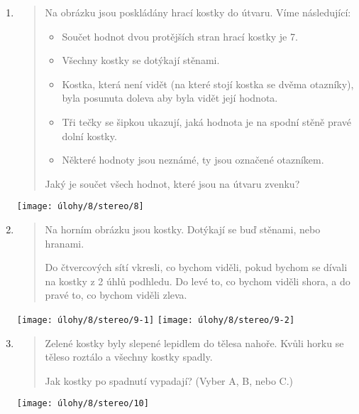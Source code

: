 \begin{enumerate}
    \item
    \begin{minipage}[t]{\linewidth}
        \begin{quote}
            Na obrázku jsou poskládány hrací kostky do útvaru. Víme následující:
            \begin{itemize}
                \item Součet hodnot dvou protějších stran hrací kostky je 7.
                \item Všechny kostky se dotýkají stěnami.
                \item Kostka, která není vidět (na které stojí kostka se dvěma otazníky), byla posunuta doleva aby byla vidět její hodnota.
                \item Tři tečky se šipkou ukazují, jaká hodnota je na spodní stěně pravé dolní kostky.
                \item Některé hodnoty jsou neznámé, ty jsou označené otazníkem.
            \end{itemize}

            Jaký je součet všech hodnot, které jsou na útvaru zvenku?
        \end{quote}
        \centering
        \texttt{[image: úlohy/8/stereo/8]}
    \end{minipage}

    \item
    \begin{minipage}[t]{\linewidth}
        \begin{quote}
            Na horním obrázku jsou kostky. Dotýkají se buď stěnami, nebo hranami.

            Do čtvercových sítí vkresli, co bychom viděli, pokud bychom se dívali na kostky z 2 úhlů podhledu. Do levé to, co bychom viděli shora, a do pravé to, co bychom viděli zleva.
        \end{quote}
        \centering
        \texttt{[image: úlohy/8/stereo/9-1]}
        \texttt{[image: úlohy/8/stereo/9-2]}
    \end{minipage}

    \item
    \begin{minipage}[t]{\linewidth}
        \begin{quote}
            Zelené kostky byly slepené lepidlem do tělesa nahoře. Kvůli horku se těleso roztálo a všechny kostky spadly.

            Jak kostky po spadnutí vypadají? (Vyber A, B, nebo C.)
        \end{quote}
        \centering
        \texttt{[image: úlohy/8/stereo/10]}
    \end{minipage}


\end{enumerate}

